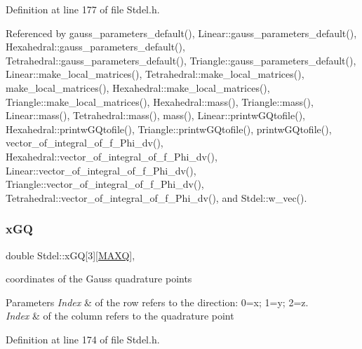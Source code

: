 Definition at line 177 of file Stdel.\+h.



Referenced by gauss\+\_\+parameters\+\_\+default(), Linear\+::gauss\+\_\+parameters\+\_\+default(), Hexahedral\+::gauss\+\_\+parameters\+\_\+default(), Tetrahedral\+::gauss\+\_\+parameters\+\_\+default(), Triangle\+::gauss\+\_\+parameters\+\_\+default(), Linear\+::make\+\_\+local\+\_\+matrices(), Tetrahedral\+::make\+\_\+local\+\_\+matrices(), make\+\_\+local\+\_\+matrices(), Hexahedral\+::make\+\_\+local\+\_\+matrices(), Triangle\+::make\+\_\+local\+\_\+matrices(), Hexahedral\+::mass(), Triangle\+::mass(), Linear\+::mass(), Tetrahedral\+::mass(), mass(), Linear\+::printw\+G\+Qtofile(), Hexahedral\+::printw\+G\+Qtofile(), Triangle\+::printw\+G\+Qtofile(), printw\+G\+Qtofile(), vector\+\_\+of\+\_\+integral\+\_\+of\+\_\+f\+\_\+\+Phi\+\_\+dv(), Hexahedral\+::vector\+\_\+of\+\_\+integral\+\_\+of\+\_\+f\+\_\+\+Phi\+\_\+dv(), Linear\+::vector\+\_\+of\+\_\+integral\+\_\+of\+\_\+f\+\_\+\+Phi\+\_\+dv(), Triangle\+::vector\+\_\+of\+\_\+integral\+\_\+of\+\_\+f\+\_\+\+Phi\+\_\+dv(), Tetrahedral\+::vector\+\_\+of\+\_\+integral\+\_\+of\+\_\+f\+\_\+\+Phi\+\_\+dv(), and Stdel\+::w\+\_\+vec().

\mbox{\label{classStdel_adedcb4d4faa12adf348054780a3b2c1a}} 
\subsubsection{\texorpdfstring{x\+GQ}{xGQ}}
{\footnotesize\ttfamily double Stdel\+::x\+GQ\mbox{[}3\mbox{]}\mbox{[}\hyperlink{MyOptions_8h_af708e94d886ba3f59582612949cac702}{M\+A\+XQ}\mbox{]}\hspace{0.3cm}{\ttfamily [protected]}, {\ttfamily [inherited]}}

coordinates of the Gauss quadrature points 
\begin{DoxyParams}{Parameters}
{\em Index} & of the row refers to the direction\+: 0=x; 1=y; 2=z. \\
\hline
{\em Index} & of the column refers to the quadrature point \\
\hline
\end{DoxyParams}


Definition at line 174 of file Stdel.\+h.



